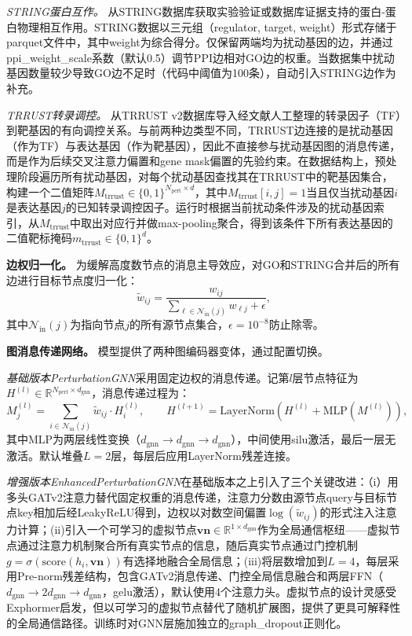 \textit{STRING蛋白互作。} 从STRING数据库获取实验验证或数据库证据支持的蛋白-蛋白物理相互作用。STRING数据以三元组（regulator, target, weight）形式存储于parquet文件中，其中weight为综合得分。仅保留两端均为扰动基因的边，并通过ppi\_weight\_scale系数（默认0.5）调节PPI边相对GO边的权重。当数据集中扰动基因数量较少导致GO边不足时（代码中阈值为100条），自动引入STRING边作为补充。

\textit{TRRUST转录调控。} 从TRRUST v2数据库\cite{han2018trrust}导入经文献人工整理的转录因子（TF）到靶基因的有向调控关系。与前两种边类型不同，TRRUST边连接的是扰动基因（作为TF）与表达基因（作为靶基因），因此不直接参与扰动基因图的消息传递，而是作为后续交叉注意力偏置和gene mask偏置的先验约束。在数据结构上，预处理阶段遍历所有扰动基因，对每个扰动基因查找其在TRRUST中的靶基因集合，构建一个二值矩阵$M_{\mathrm{trrust}}\in\{0,1\}^{N_{\mathrm{pert}}\times d}$，其中$M_{\mathrm{trrust}}[i,j]=1$当且仅当扰动基因$i$是表达基因$j$的已知转录调控因子。运行时根据当前扰动条件涉及的扰动基因索引，从$M_{\mathrm{trrust}}$中取出对应行并做max-pooling聚合，得到该条件下所有表达基因的二值靶标掩码$m_{\mathrm{trrust}}\in\{0,1\}^{d}$。

\textbf{边权归一化。} 为缓解高度数节点的消息主导效应，对GO和STRING合并后的所有边进行目标节点度归一化：
\begin{equation}
\tilde{w}_{ij}=\frac{w_{ij}}{\sum_{\ell\in\mathcal{N}_{\mathrm{in}}(j)}w_{\ell j}+\epsilon},
\label{eq:degree_norm}
\end{equation}
其中$\mathcal{N}_{\mathrm{in}}(j)$为指向节点$j$的所有源节点集合，$\epsilon=10^{-8}$防止除零。

\textbf{图消息传递网络。} 模型提供了两种图编码器变体，通过配置切换。

\textit{基础版本PerturbationGNN}采用固定边权的消息传递。记第$l$层节点特征为$H^{(l)}\in\mathbb{R}^{N_{\mathrm{pert}}\times d_{\mathrm{gnn}}}$，消息传递过程为：
\begin{equation}
M_j^{(l)}=\sum_{i\in\mathcal{N}_{\mathrm{in}}(j)}\tilde{w}_{ij}\cdot H_i^{(l)},\qquad
H^{(l+1)}=\mathrm{LayerNorm}\left(H^{(l)}+\mathrm{MLP}\left(M^{(l)}\right)\right),
\label{eq:gnn_basic}
\end{equation}
其中MLP为两层线性变换（$d_{\mathrm{gnn}}\to d_{\mathrm{gnn}}\to d_{\mathrm{gnn}}$），中间使用silu激活，最后一层无激活。默认堆叠$L=2$层，每层后应用LayerNorm残差连接。

\textit{增强版本EnhancedPerturbationGNN}在基础版本之上引入了三个关键改进：（i）用多头GATv2注意力替代固定权重的消息传递，注意力分数由源节点query与目标节点key相加后经LeakyReLU得到，边权以对数空间偏置$\log(\tilde{w}_{ij})$的形式注入注意力计算；(ii)引入一个可学习的虚拟节点$\mathbf{vn}\in\mathbb{R}^{1\times d_{\mathrm{gnn}}}$作为全局通信枢纽——虚拟节点通过注意力机制聚合所有真实节点的信息，随后真实节点通过门控机制$g=\sigma(\mathrm{score}(h_i,\mathbf{vn}))$有选择地融合全局信息；(iii)将层数增加到$L=4$，每层采用Pre-norm残差结构，包含GATv2消息传递、门控全局信息融合和两层FFN（$d_{\mathrm{gnn}}\to 2d_{\mathrm{gnn}}\to d_{\mathrm{gnn}}$，gelu激活），默认使用4个注意力头。虚拟节点的设计灵感受Exphormer启发，但以可学习的虚拟节点替代了随机扩展图，提供了更具可解释性的全局通信路径。训练时对GNN层施加独立的graph\_dropout正则化。

